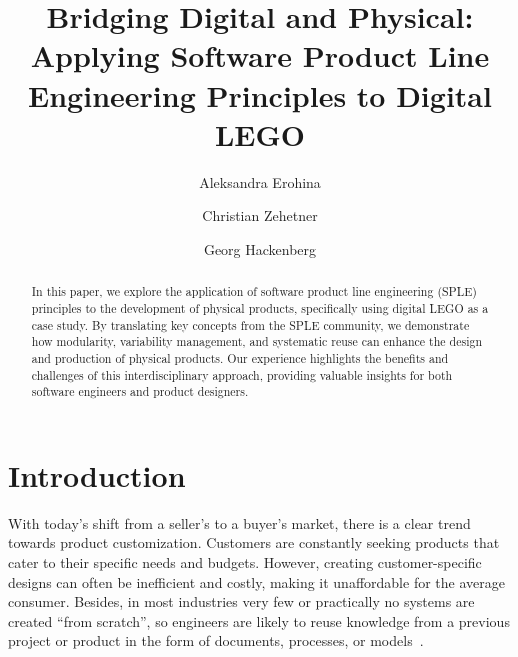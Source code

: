 \documentclass[sigconf,review]{acmart}
\begin{document}
\title{Bridging Digital and Physical: Applying Software Product Line Engineering Principles to Digital LEGO}

\author{Aleksandra Erohina}

\author{Christian Zehetner}

\author{Georg Hackenberg}

\begin{abstract}
    In this paper, we explore the application of software product line engineering (SPLE) principles to the development of physical products, specifically using digital LEGO as a case study. 
    By translating key concepts from the SPLE community, we demonstrate how modularity, variability management, and systematic reuse can enhance the design and production of physical products. 
    Our experience highlights the benefits and challenges of this interdisciplinary approach, providing valuable insights for both software engineers and product designers.
\end{abstract}


\maketitle

\section{Introduction}
\label{sec:introduction}

With today's shift from a seller's to a buyer's market, there is a clear trend towards product customization. 
Customers are constantly seeking products that cater to their specific needs and budgets. 
However, creating customer-specific designs can often be inefficient and costly, making it unaffordable for the average consumer.
Besides, in most industries very few or practically no systems are created “from scratch”, so engineers are likely to reuse knowledge from a previous project or product in the form of documents, processes, or models~\cite{Góngora_2015}. 
\end{document}
